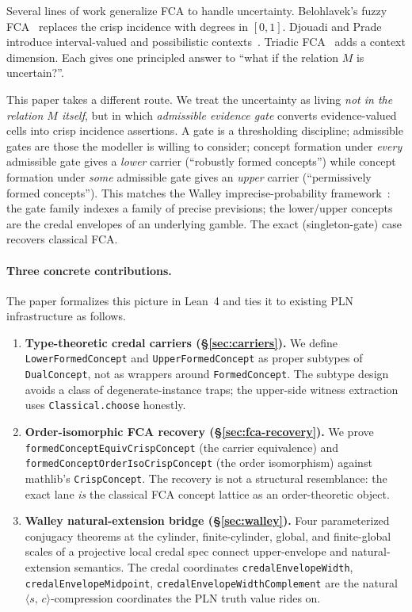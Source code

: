 \documentclass[]{article}
\newcommand{\lid}[1]{{\ttfamily\nolinkurl{#1}}}
\newcommand{\STV}[2]{\langle #1,\, #2 \rangle}
\begin{document}
Several lines of work generalize FCA to handle uncertainty. Belohlavek's fuzzy
FCA~\cite{belohlavek1999} replaces the crisp incidence with degrees in $[0,1]$.
Djouadi and Prade introduce interval-valued and possibilistic
contexts~\cite{djouadi2009}. Triadic FCA~\cite{wille1995} adds a context dimension.
Each gives one principled answer to ``what if the relation $M$ is uncertain?''.

This paper takes a different route. We treat the uncertainty as living \emph{not in
the relation $M$ itself}, but in which \emph{admissible evidence gate} converts
evidence-valued cells into crisp incidence assertions. A gate is a thresholding
discipline; admissible gates are those the modeller is willing to consider; concept
formation under \emph{every} admissible gate gives a \emph{lower} carrier
(``robustly formed concepts'') while concept formation under \emph{some} admissible
gate gives an \emph{upper} carrier (``permissively formed concepts''). This matches
the Walley imprecise-probability framework~\cite{walley1991}: the gate family
indexes a family of precise previsions; the lower/upper concepts are the credal
envelopes of an underlying gamble. The exact (singleton-gate) case recovers
classical FCA.

\paragraph{Three concrete contributions.} The paper formalizes this picture in
Lean~4 and ties it to existing PLN infrastructure as follows.

\begin{enumerate}
\item \textbf{Type-theoretic credal carriers (\S\ref{sec:carriers}).} We define
\lid{LowerFormedConcept} and \lid{UpperFormedConcept} as proper subtypes of
\lid{DualConcept}, not as wrappers around \lid{FormedConcept}. The subtype design
avoids a class of degenerate-instance traps; the upper-side witness extraction
uses \lid{Classical.choose} honestly.

\item \textbf{Order-isomorphic FCA recovery (\S\ref{sec:fca-recovery}).} We prove
\lid{formedConceptEquivCrispConcept} (the carrier equivalence) and
\lid{formedConceptOrderIsoCrispConcept} (the order isomorphism) against mathlib's
\lid{CrispConcept}. The recovery is not a structural resemblance: the exact lane
\emph{is} the classical FCA concept lattice as an order-theoretic object.

\item \textbf{Walley natural-extension bridge (\S\ref{sec:walley}).} Four
parameterized conjugacy theorems at the cylinder, finite-cylinder, global, and
finite-global scales of a projective local credal spec connect upper-envelope and
natural-extension semantics. The credal coordinates \lid{credalEnvelopeWidth},
\lid{credalEnvelopeMidpoint}, \lid{credalEnvelopeWidthComplement} are the natural
$\STV{s}{c}$-compression coordinates the PLN truth value rides on.
\end{enumerate}
\end{document}
